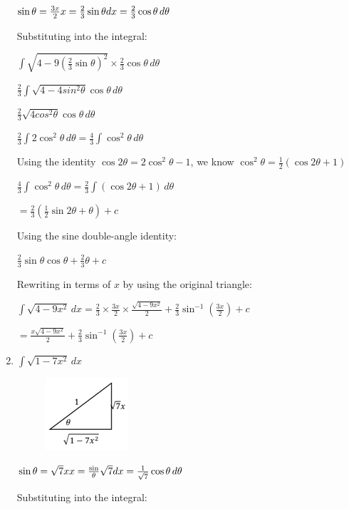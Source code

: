 \documentclass[../main.tex]{subfiles}
\begin{document}
\begin{enumerate}
    \(\sin{\theta}=\frac{3x}{2}\\
    x=\frac{2}{3}\sin{\theta}\\
    dx=\frac{2}{3}\cos{\theta}\,d\theta\)

    Substituting into the integral:

    \(\int \sqrt{4-9(\frac{2}{3}\sin{\theta})^2} \times \frac{2}{3}\cos{\theta}\,d\theta\)

    \(\frac{2}{3}\int \sqrt{4-4sin^2{\theta}}\cos{\theta}\,d\theta\)
    
    \(\frac{2}{3}\sqrt{4cos^2{\theta}}\cos{\theta}\,d\theta\)

    \(\frac{2}{3}\int 2\cos^2{\theta}\,d\theta=\frac{4}{3}\int \cos^2{\theta}\,d\theta\)

    Using the identity \(\cos{2\theta}=2\cos^2{\theta}-1\), we know \(\cos^2{\theta}=\frac{1}{2}(\cos{2\theta}+1)\)

    \(\frac{4}{3}\int \cos^2{\theta}\,d\theta=\frac{2}{3}\int (\cos{2\theta}+1)\,d\theta\)

    \(=\frac{2}{3}(\frac{1}{2}\sin{2\theta}+\theta)+c\)

    Using the sine double-angle identity:

    \(\frac{2}{3}\sin{\theta}\cos{\theta}+\frac{2}{3}\theta+c\)

    Rewriting in terms of \(x\) by using the original triangle:

    \(\int \sqrt{4-9x^2}\,dx=\frac{2}{3}\times \frac{3x}{2}\times \frac{\sqrt{4-9x^2}}{2}+\frac{2}{3}\sin^{-1}{(\frac{3x}{2})}+c\)

    \(=\frac{x\sqrt{4-9x^2}}{2}+\frac{2}{3}\sin^{-1}{(\frac{3x}{2})}+c\)

    \item 
    \(\int \sqrt{1-7x^2}\,dx\)
    \begin{figure}[h]
        \includegraphics{images/trigsuba3.png}
    \end{figure}

    \(\sin{\theta}=\sqrt{7}x\\
    x=\frac\sin{\theta}{\sqrt{7}}\\
    dx=\frac{1}{\sqrt{7}}\cos{\theta}\,d\theta\)

    Substituting into the integral:


\end{enumerate}
\end{document}
